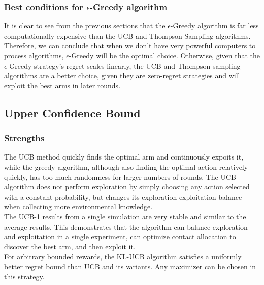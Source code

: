\subsubsection{Best conditions for $\epsilon$-Greedy algorithm}
It is clear to see from the previous sections that the $\epsilon$-Greedy algorithm is far less computationally expensive than the UCB and Thompson Sampling algorithms. 
Therefore, we can conclude that when we don't have very powerful computers to process algorithms, $\epsilon$-Greedy will be the optimal choice. 
Otherwise, given that the $\epsilon$-Greedy strategy's regret scales linearly, the UCB and Thompson sampling algorithms are a better choice, given they are zero-regret strategies and will exploit the best arms in later rounds.

\subsection{Upper Confidence Bound}\label{subsec:upper-confidence-bound2}

\subsubsection{Strengths}
The UCB method quickly finds the optimal arm and continuously expoits it, while the greedy algorithm, although also finding the optimal action relatively quickly, has too much randomness for larger numbers of rounds.
The UCB algorithm does not perform exploration by simply choosing any action selected with a constant probability, but changes its exploration-exploitation balance when collecting more environmental knowledge.
\\The UCB-1 results from a single simulation are very stable and similar to the average results.
This demonstrates that the algorithm can balance exploration and exploitation in a single experiment, can optimize contact allocation to discover the best arm, and then exploit it.
\\ For arbitrary bounded rewards, the KL-UCB algorithm satisfies a uniformly better regret bound than UCB and its variants. Any maximizer can be chosen in this strategy.\citep{Garivier2011}

